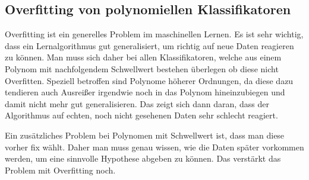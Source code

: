 \subsection{Overfitting von polynomiellen Klassifikatoren}

Overfitting ist ein generelles Problem im maschinellen Lernen. Es ist sehr wichtig, dass ein Lernalgorithmus gut generalisiert, um richtig auf neue Daten reagieren zu können. Man muss sich daher bei allen Klassifikatoren, welche aus einem Polynom mit nachfolgendem Schwellwert bestehen überlegen ob diese nicht Overfitten. Speziell betroffen sind Polynome höherer Ordnungen, da diese dazu tendieren auch Ausreißer irgendwie noch in das Polynom hineinzubiegen und damit nicht mehr gut generalisieren. Das zeigt sich dann daran, dass der Algorithmus auf echten, noch nicht gesehenen Daten sehr schlecht reagiert. 

Ein zusätzliches Problem bei Polynomen mit Schwellwert ist, dass man diese vorher fix wählt. Daher man muss genau wissen, wie die Daten später vorkommen werden, um eine sinnvolle Hypothese abgeben zu können. Das verstärkt das Problem mit Overfitting noch. 

